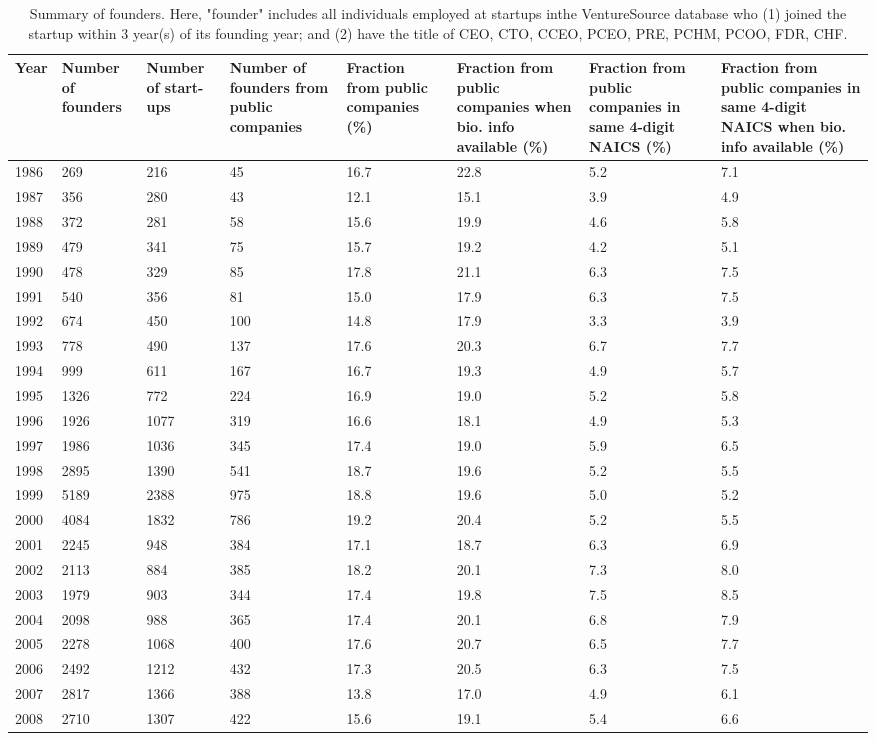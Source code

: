\begin{table}[!htb]
\centering
\begingroup\scriptsize
\begin{tabular}{p{1.75cm}p{1.75cm}p{1.75cm}p{1.75cm}p{1.75cm}p{1.75cm}p{1.75cm}p{1.75cm}}
  \toprule
Year & Number of founders & Number of start-ups & Number of founders from public companies & Fraction from public companies (\%) & Fraction from public companies when bio. info available (\%) & Fraction from public companies in same 4-digit NAICS (\%) & Fraction from public companies in same 4-digit NAICS when bio. info available (\%) \\ 
  \midrule
1986 & 269 & 216 & 45 & 16.7 & 22.8 & 5.2 & 7.1 \\ 
  1987 & 356 & 280 & 43 & 12.1 & 15.1 & 3.9 & 4.9 \\ 
  1988 & 372 & 281 & 58 & 15.6 & 19.9 & 4.6 & 5.8 \\ 
  1989 & 479 & 341 & 75 & 15.7 & 19.2 & 4.2 & 5.1 \\ 
  1990 & 478 & 329 & 85 & 17.8 & 21.1 & 6.3 & 7.5 \\ 
  1991 & 540 & 356 & 81 & 15.0 & 17.9 & 6.3 & 7.5 \\ 
  1992 & 674 & 450 & 100 & 14.8 & 17.9 & 3.3 & 3.9 \\ 
  1993 & 778 & 490 & 137 & 17.6 & 20.3 & 6.7 & 7.7 \\ 
  1994 & 999 & 611 & 167 & 16.7 & 19.3 & 4.9 & 5.7 \\ 
  1995 & 1326 & 772 & 224 & 16.9 & 19.0 & 5.2 & 5.8 \\ 
  1996 & 1926 & 1077 & 319 & 16.6 & 18.1 & 4.9 & 5.3 \\ 
  1997 & 1986 & 1036 & 345 & 17.4 & 19.0 & 5.9 & 6.5 \\ 
  1998 & 2895 & 1390 & 541 & 18.7 & 19.6 & 5.2 & 5.5 \\ 
  1999 & 5189 & 2388 & 975 & 18.8 & 19.6 & 5.0 & 5.2 \\ 
  2000 & 4084 & 1832 & 786 & 19.2 & 20.4 & 5.2 & 5.5 \\ 
  2001 & 2245 & 948 & 384 & 17.1 & 18.7 & 6.3 & 6.9 \\ 
  2002 & 2113 & 884 & 385 & 18.2 & 20.1 & 7.3 & 8.0 \\ 
  2003 & 1979 & 903 & 344 & 17.4 & 19.8 & 7.5 & 8.5 \\ 
  2004 & 2098 & 988 & 365 & 17.4 & 20.1 & 6.8 & 7.9 \\ 
  2005 & 2278 & 1068 & 400 & 17.6 & 20.7 & 6.5 & 7.7 \\ 
  2006 & 2492 & 1212 & 432 & 17.3 & 20.5 & 6.3 & 7.5 \\ 
  2007 & 2817 & 1366 & 388 & 13.8 & 17.0 & 4.9 & 6.1 \\ 
  2008 & 2710 & 1307 & 422 & 15.6 & 19.1 & 5.4 & 6.6 \\ 
   \bottomrule
\end{tabular}
\endgroup
\caption{Summary of founders. Here, "founder" includes all individuals employed at startups inthe VentureSource database who (1) joined the startup within 3 year(s) of its founding year; and (2) have the title of CEO, CTO, CCEO, PCEO, PRE, PCHM, PCOO, FDR, CHF.} 
\label{table:GStable_founder2}
\end{table}
